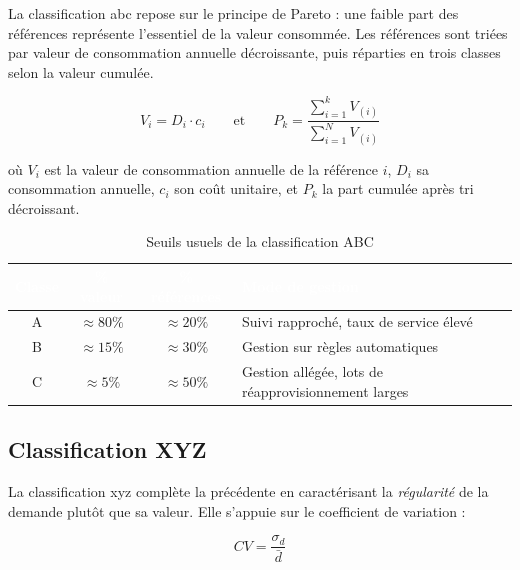 La classification \gls{abc} repose sur le principe de Pareto : une faible part
des références représente l'essentiel de la valeur consommée. Les références
sont triées par valeur de consommation annuelle décroissante, puis réparties en
trois classes selon la valeur cumulée.

\begin{equation}
  V_{i} = D_{i} \cdot c_{i}
  \qquad\text{et}\qquad
  P_{k} = \frac{\sum_{i=1}^{k} V_{(i)}}{\sum_{i=1}^{N} V_{(i)}}
  \label{eq:abc}
\end{equation}

où $V_{i}$ est la valeur de consommation annuelle de la référence $i$, $D_{i}$
sa consommation annuelle, $c_{i}$ son coût unitaire, et $P_{k}$ la part cumulée
après tri décroissant.

\begin{table}[H]
  \centering
  \caption{Seuils usuels de la classification ABC}
  \label{tab:seuils_abc}
  \renewcommand{\arraystretch}{1.4}
  \begin{tabularx}{\textwidth}{|c|c|c|X|}
    \hline
    \rowcolor{iacsTableHead}
    \textcolor{white}{\textbf{Classe}} &
    \textcolor{white}{\textbf{\% valeur}} &
    \textcolor{white}{\textbf{\% références}} &
    \textcolor{white}{\textbf{Mode de gestion}} \\
    \hline
    A & $\approx 80\%$ & $\approx 20\%$ & Suivi rapproché, taux de service élevé \\
    \hline
    \rowcolor{iacsLightGray}
    B & $\approx 15\%$ & $\approx 30\%$ & Gestion sur règles automatiques \\
    \hline
    C & $\approx 5\%$  & $\approx 50\%$ & Gestion allégée, lots de réapprovisionnement larges \\
    \hline
  \end{tabularx}
\end{table}

\subsection{Classification XYZ}

La classification \gls{xyz} complète la précédente en caractérisant la
\emph{régularité} de la demande plutôt que sa valeur. Elle s'appuie sur le
coefficient de variation :

\begin{equation}
  CV = \frac{\sigma_{d}}{\bar{d}}
  \label{eq:cv}
\end{equation}

